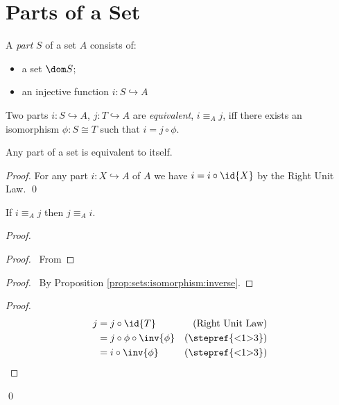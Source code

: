 \section{Parts of a Set}

\begin{df}[Part]
  A \emph{part} $S$ of a set $A$ consists of:
  \begin{itemize}
   \item a set $\dom S$;
   \item an injective function $i : S \hookrightarrow A$
  \end{itemize}
\end{df}

\begin{df}
  Two parts $i : S \hookrightarrow A$, $j : T \hookrightarrow A$ are
  \emph{equivalent}, $i \equiv_A j$, iff there exists an isomorphism $\phi :
S \cong T$ such that $i = j \circ \phi$.
\end{df}

\begin{prop}
 Any part of a set is equivalent to itself.
\end{prop}

\begin{proof}
 \pf
 For any part $i : X \hookrightarrow A$ of $A$ we have $i = i \circ \id{X}$ by the Right Unit Law. \qed
\end{proof}

\begin{prop}
 If $i \equiv_A j$ then $j \equiv_A i$.
\end{prop}

\begin{proof}
 \pf
 \begin{proof}
   \pf\ From 
 \end{proof}
 \begin{proof}
   \pf\ By Proposition \ref{prop:sets:isomorphism:inverse}.
 \end{proof}
 \begin{proof}
   \pf
   \begin{align*}
     j & = j \circ \id{T} & (\text{Right Unit Law})\\
     & = j \circ \phi \circ \inv{\phi} & (\text{\stepref{<1>3}})\\
     & = i \circ \inv{\phi} & (\text{\stepref{<1>3}})
   \end{align*}
 \end{proof}
 \qed
\end{proof}

